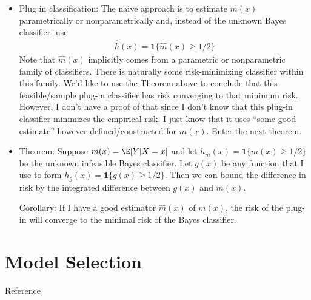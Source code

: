 \documentclass[12pt]{article}
\theoremstyle{plain}
\theoremstyle{definition}
\theoremstyle{remark}
\begin{document}
\begin{itemize}
  \item Plug in classification:
    The naive approach is to estimate $m(x)$ parametrically or
    nonparametrically and, instead of the unknown Bayes classifier, use
    \begin{align*}
      \hat{h}(x) = \mathbf{1}\{\hat{m}(x)\geq 1/2\}
    \end{align*}
    Note that $\hat{m}(x)$ implicitly comes from a parametric or
    nonparametric family of classifiers.
    There is naturally some risk-minimizing classifier within this
    family.
    We'd like to use the Theorem above to conclude that this
    feasible/sample plug-in classifier has risk converging to that
    minimum risk.  However, I don't have a proof of that since I don't
    know that this plug-in classifier minimizes the empirical risk.
    I just know that it uses ``some good estimate'' however
    defined/constructed for $m(x)$.
    Enter the next theorem.

  \item
    Theorem:
    Suppose $m(x)=\E[Y|X=x]$ and let $h_m(x)=\mathbf{1}\{m(x)\geq 1/2\}$
    be the unknown infeasible Bayes classifier.
    Let $g(x)$ be any function that I use to form
    $h_g(x)=\mathbf{1}\{g(x)\geq 1/2\}$.
    Then we can bound the difference in risk by the
    integrated difference between $g(x)$ and $m(x)$.

    Corollary:
    If I have a good estimator $\hat{m}(x)$ of $m(x)$, the risk
    of the plug-in will converge to the minimal risk of the Bayes
    classifier.
\end{itemize}


\clearpage
\section{Model Selection}

\href{http://www.stat.cmu.edu/~larry/=stat705/Lecture16.pdf}{Reference}
\end{document}
